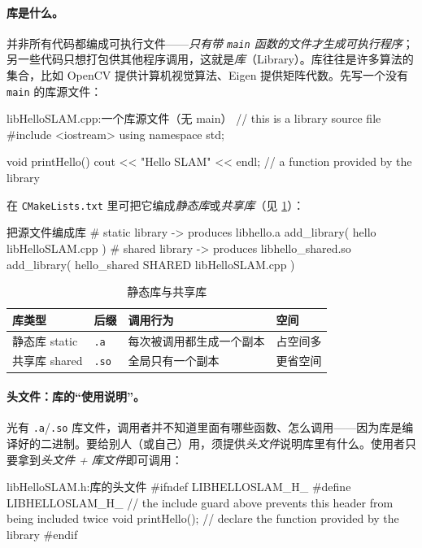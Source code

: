 \paragraph{库是什么。}
并非所有代码都编成可执行文件——\emph{只有带 \texttt{main} 函数的文件才生成可执行程序}；另一些代码只想打包供其他程序调用，这就是\emph{库}（Library）。库往往是许多算法的集合，比如 OpenCV 提供计算机视觉算法、Eigen 提供矩阵代数。先写一个没有 \texttt{main} 的库源文件：

\begin{codebox}[C++]{libHelloSLAM.cpp:一个库源文件（无 main）}
// this is a library source file
#include <iostream>
using namespace std;

void printHello() {
    cout << "Hello SLAM" << endl;   // a function provided by the library
}
\end{codebox}

\noindent 在 \texttt{CMakeLists.\allowbreak txt} 里可把它编成\emph{静态库}或\emph{共享库}（见 \cref{tab:intro-libtype}）：

\begin{codebox}[text]{把源文件编成库}
# static library -> produces libhello.a
add_library( hello libHelloSLAM.cpp )
# shared library -> produces libhello_shared.so
add_library( hello_shared SHARED libHelloSLAM.cpp )
\end{codebox}

\begin{table}[H]\centering\small
\caption{静态库与共享库}
\label{tab:intro-libtype}
\begin{tabular}{p{} p{} p{} p{}}
\toprule
库类型 & 后缀 & 调用行为 & 空间 \\
\midrule
静态库 static & \texttt{.a} & 每次被调用都生成一个副本 & 占空间多 \\
共享库 shared & \texttt{.so} & 全局只有一个副本 & 更省空间 \\
\bottomrule
\end{tabular}
\end{table}

\paragraph{头文件：库的“使用说明”。}
光有 \texttt{.a}/\allowbreak\texttt{.so} 库文件，调用者并不知道里面有哪些函数、怎么调用——因为库是编译好的二进制。要给别人（或自己）用，须提供\emph{头文件}说明库里有什么。使用者只要拿到\emph{头文件 + 库文件}即可调用：

\begin{codebox}[C++]{libHelloSLAM.h:库的头文件}
#ifndef LIBHELLOSLAM_H_
#define LIBHELLOSLAM_H_
// the include guard above prevents this header from being included twice
void printHello();   // declare the function provided by the library
#endif
\end{codebox}

